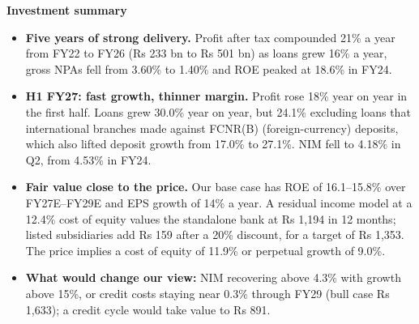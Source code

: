 \documentclass[10pt,a4paper]{article}
\begin{document}
\begin{minipage}[t]{0.63\linewidth}
\vspace{0pt}\small
\textbf{Investment summary}
\begin{itemize}
\item \textbf{Five years of strong delivery.} Profit after tax compounded 21\% a year from FY22 to FY26 (Rs 233 bn to Rs 501 bn) as loans grew 16\% a year, gross NPAs fell from 3.60\% to 1.40\% and ROE peaked at 18.6\% in FY24.
\item \textbf{H1 FY27: fast growth, thinner margin.} Profit rose 18\% year on year in the first half. Loans grew 30.0\% year on year, but 24.1\% excluding loans that international branches made against FCNR(B) (foreign-currency) deposits, which also lifted deposit growth from 17.0\% to 27.1\%. NIM fell to 4.18\% in Q2, from 4.53\% in FY24.
\item \textbf{Fair value close to the price.} Our base case has ROE of 16.1--15.8\% over FY27E--FY29E and EPS growth of 14\% a year. A residual income model at a 12.4\% cost of equity values the standalone bank at Rs 1,194 in 12 months; listed subsidiaries add Rs 159 after a 20\% discount, for a target of Rs 1,353. The price implies a cost of equity of 11.9\% or perpetual growth of 9.0\%.
\item \textbf{What would change our view:} NIM recovering above 4.3\% with growth above 15\%, or credit costs staying near 0.3\% through FY29 (bull case Rs 1,633); a credit cycle would take value to Rs 891.
\end{itemize}
\end{minipage}
\end{document}
